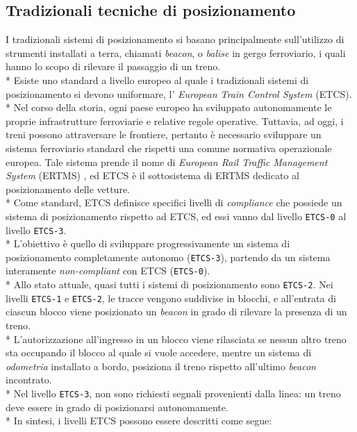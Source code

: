 \subsection{Tradizionali tecniche di posizionamento}
I tradizionali sistemi di posizionamento si basano principalmente sull'utilizzo di strumenti installati a terra, chiamati \emph{beacon}, o \emph{balise} in gergo ferroviario, i quali hanno lo scopo di rilevare il passaggio di un treno. \cite{tecnicheodierne}\\*
Esiste uno standard a livello europeo al quale i tradizionali sistemi di posizionamento si devono uniformare, l' \emph{European Train Control System} (ETCS).\\*
Nel corso della storia, ogni paese europeo ha sviluppato autonomamente le proprie infrastrutture ferroviarie e relative regole operative. Tuttavia, ad oggi, i treni possono attraversare le frontiere, pertanto \`e necessario sviluppare un sistema ferroviario standard che rispetti una comune normativa operazionale europea. Tale sistema prende il nome di \emph{European Rail Traffic Management System} (ERTMS) \cite{ertms}, ed ETCS \`e il sottosistema di ERTMS dedicato al posizionamento delle vetture.\\*
Come standard, ETCS definisce specifici livelli di \emph{compliance} che possiede un sistema di posizionamento rispetto ad ETCS, ed essi vanno dal livello \texttt{ETCS-0} al livello \texttt{ETCS-3}.\\*
L'obiettivo \`e quello di sviluppare progressivamente un sistema di posizionamento completamente autonomo (\texttt{ETCS-3}), partendo da un sistema interamente \emph{non-compliant} con ETCS (\texttt{ETCS-0}).
\\*
Allo stato attuale, quasi tutti i sistemi di posizionamento sono \texttt{ETCS-2}. Nei livelli \texttt{ETCS-1} e \texttt{ETCS-2}, le tracce vengono suddivise in blocchi, e all'entrata di ciascun blocco viene posizionato un \emph{beacon} in grado di rilevare la presenza di un treno.\\*
L'autorizzazione all'ingresso in un blocco viene rilasciata se nessun altro treno sta occupando il blocco al quale si vuole accedere, mentre un sistema di \emph{odometria} installato a bordo, posiziona il treno rispetto all'ultimo \emph{beacon} incontrato.\\*
Nel livello \texttt{ETCS-3}, non sono richiesti segnali provenienti dalla linea: un treno deve essere in grado di posizionarsi autonomamente. \cite{etcs3}\\*
In sintesi, i livelli ETCS possono essere descritti come segue:
